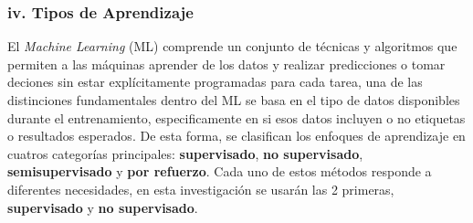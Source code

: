 \documentclass[11pt]{article} %
\begin{document}
\subsubsection*{iv. Tipos de Aprendizaje}
El \textit{Machine Learning} (ML) comprende un conjunto de técnicas y algoritmos que permiten a las máquinas aprender de los datos y realizar predicciones o tomar deciones sin estar explícitamente programadas para cada tarea, una de las distinciones fundamentales dentro del ML se basa en el tipo de datos disponibles durante el entrenamiento, especificamente en si esos datos incluyen o no etiquetas o resultados esperados. De esta forma, se clasifican los enfoques de aprendizaje en cuatros categorías principales: \textbf{supervisado}, \textbf{no supervisado}, \textbf{semisupervisado} y \textbf{por refuerzo}. Cada uno de estos métodos responde a diferentes necesidades, en esta investigación se usarán las 2 primeras, \textbf{supervisado} y \textbf{no supervisado}.
\end{document}
